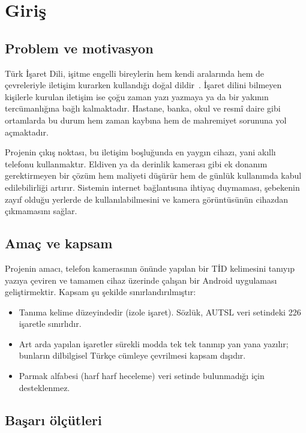 \section{Giriş}
\label{CH:Giris}

\subsection{Problem ve motivasyon}

Türk İşaret Dili, işitme engelli bireylerin hem kendi aralarında hem de çevreleriyle
iletişim kurarken kullandığı doğal dildir~\cite{TIF2023}. İşaret dilini bilmeyen
kişilerle kurulan iletişim ise çoğu zaman yazı yazmaya ya da bir yakının
tercümanlığına bağlı kalmaktadır. Hastane, banka, okul ve resmî daire gibi ortamlarda
bu durum hem zaman kaybına hem de mahremiyet sorununa yol açmaktadır.

Projenin çıkış noktası, bu iletişim boşluğunda en yaygın cihazı, yani akıllı telefonu
kullanmaktır. Eldiven ya da derinlik kamerası gibi ek donanım gerektirmeyen bir çözüm
hem maliyeti düşürür hem de günlük kullanımda kabul edilebilirliği artırır. Sistemin
internet bağlantısına ihtiyaç duymaması, şebekenin zayıf olduğu yerlerde de
kullanılabilmesini ve kamera görüntüsünün cihazdan çıkmamasını sağlar.

\subsection{Amaç ve kapsam}

Projenin amacı, telefon kamerasının önünde yapılan bir TİD kelimesini tanıyıp yazıya
çeviren ve tamamen cihaz üzerinde çalışan bir Android uygulaması geliştirmektir.
Kapsam şu şekilde sınırlandırılmıştır:

\begin{itemize}
  \item Tanıma kelime düzeyindedir (izole işaret). Sözlük, AUTSL veri setindeki 226
        işaretle sınırlıdır.
  \item Art arda yapılan işaretler sürekli modda tek tek tanınıp yan yana yazılır;
        bunların dilbilgisel Türkçe cümleye çevrilmesi kapsam dışıdır.
  \item Parmak alfabesi (harf harf heceleme) veri setinde bulunmadığı için desteklenmez.
\end{itemize}

\subsection{Başarı ölçütleri}

